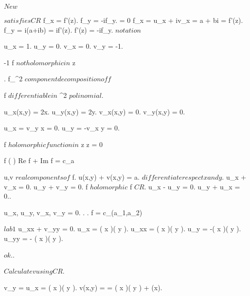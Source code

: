 \documentclass[../Main/main]{subfiles}
\begin{document}
\unit{ $ New $ }
{

	
	
	
	{
		{
			 $ satisfies CR $
		}
		\holds
		{
			f_x = f'(z).
			f_y = -if_y.
			 = 0
		}
		\demonstration
		{
			f_x = u_x + iv_x = a + bi = f'(z).
			f_y = i(a+ib) = if'(z).
			f'(z) = -if_y.
			$notation$
		}
	}


	{
		{
		}
		{
			u_x = 1.
			u_y = 0.
			v_x = 0.
			v_y = -1.

			{
				-1  \imp f $ not holomorphic in $ z
			}
		}
	}


	{
		{
			.
			f_{\R^2} $ component decomposition of f $
		}
		{
			f $ differentiable in $ \R^2 $ polinomial $.
			{
				u_x(x,y) = 2x.
				u_y(x,y) = 2y.
				v_x(x,y) = 0.
				v_y(x,y) = 0.

				u_x = v_y \ifandonlyif x = 0.
				u_y = -v_x \ifandonlyif y = 0.

				f $ holomorphic function in $ z \ifandonlyif z = 0
			}
		}
	}
	

	{
		{
			f \in \Hc( \C ) \suchthat Re f + Im f = c_a
		}
		\showthat
		{
		}
		\demonstration
		{
			u,v $ real components of $ f.
			u(x,y) + v(x,y) = a.
			$ differentiate respect x and y $.
			u_x + v_x = 0.
			u_y + v_y = 0.
			f $ holomorphic $ \imp f $ CR $.
			u_x - u_y = 0.
			u_y + u_x = 0..

			u_x, u_y, v_x, v_y = 0.
			.
			.
			f = c_{(a_1,a_2)}
		}
	}


	{
		{
		}
		\showthat
		{
		}
		\demonstration
		{
			$lab 1$ \imp u_{xx} + v_{yy} = 0.
			u_x = \exp( x )\cos( y ).
			u_{xx} = \exp( x )\cos( y ).
			u_y = -\exp( x )\sin( y ).
			u_{yy} = - \exp( x )\cos( y ).

			$ok$..

			$ Calculate v using CR $.

			v_y = u_x = \exp( x )\cos( y ).
			v(x,y) =  = \exp( x )\sin( y ) + \phi(x).

}}}
\end{document}
